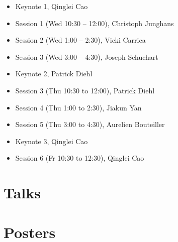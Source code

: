 \documentclass[12pt,letterpaper]{book}
\newenvironment{conf-abstract}[4][]{
 \needspace{10\baselineskip}
 \begin{center}
 { \renewcommand\textsuperscript[1]{}
 \phantomsection\addcontentsline{toc}{section}
 {\texorpdfstring{#2 (\emph{#3})}{#2 (#3)}}
 }
 {{\large\bfseries #2}\marginnote{#1}\par}
 \medskip
 {#3\par}
 \smallskip
 {\small #4\par}
 \end{center}
}{%
 \bigskip
 \hrule
 \bigskip
}
\newcommand{\indexauthors}[1]{%
 \forcsvlist{\index}{#1}
}
\begin{document}
\begin{itemize}
\item Keynote 1, Qinglei Cao 
\item Session 1 (Wed 10:30 -- 12:00), Christoph Junghans 
\item Session 2 (Wed 1:00 -- 2:30), Vicki Carrica
\item Session 3 (Wed 3:00 -- 4:30), Joseph Schuchart
\item Keynote 2, Patrick Diehl
\item Session 3 (Thu 10:30 to 12:00), Patrick Diehl
\item Session 4 (Thu 1:00 to 2:30), Jiakun Yan 
\item Session 5 (Thu 3:00 to 4:30), Aurelien Bouteiller 
\item Keynote 3, Qinglei Cao
\item Session 6 (Fr 10:30 to 12:30), Qinglei Cao
\end{itemize}

\chapter{Talks}

{
\begin{conf-abstract}[\datum\\\tiny\time]
{\title}
{\first~ \last}
{\affiliation}
\indexauthors{\last~\first}

\newpage
\end{conf-abstract}
}

\chapter{Posters}

{
\def\x{\last}
\def\y{\substring{\x}{1}{1}\par}
\begin{conf-abstract}[\datum\\\time]
{\title}
{\first~\last}
{\affiliation}
\indexauthors{\last~\first}
\begin{center}

\end{center}
\end{conf-abstract}
}


%
\end{document}
